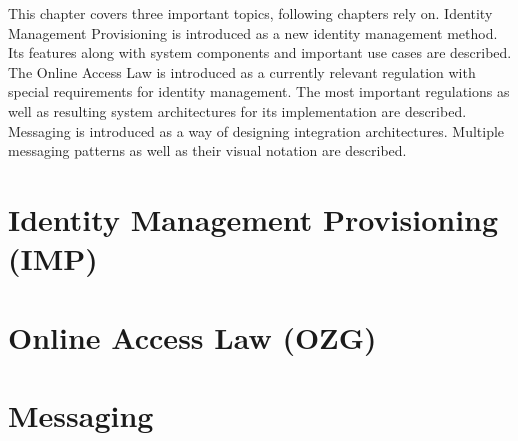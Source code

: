 This chapter covers three important topics, following chapters rely on.
Identity Management Provisioning is introduced as a new identity management method. Its features along with system components and important use cases are described. 
The Online Access Law is introduced as a currently relevant regulation with special requirements for identity management. The most important regulations as well as resulting system architectures for its implementation are described.
Messaging is introduced as a way of designing integration architectures. Multiple messaging patterns as well as their visual notation are described.

\section{Identity Management Provisioning (IMP)}


\section{Online Access Law (OZG)}


\section{Messaging}
